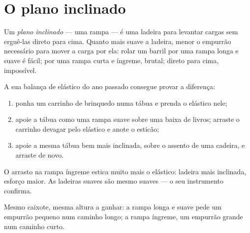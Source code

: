 \section{O plano inclinado}

\begin{definition}\label{def:g5:simple-machines:ramp}
Um \emph{plano inclinado} --- uma rampa --- é
uma ladeira para levantar cargas sem erguê-las direto para cima.
Quanto mais suave a ladeira, menor o empurrão necessário para mover a
carga por ela: rolar um barril por uma rampa longa e suave é fácil;
por uma rampa curta e íngreme, brutal; direto para cima, impossível.
\end{definition}

\begin{method}\label{met:g5:simple-machines:measure}
A sua balança de elástico do ano passado consegue provar a diferença:
\begin{enumerate}
  \item ponha um carrinho de brinquedo numa tábua e prenda o elástico
        nele;
  \item apoie a tábua como uma rampa suave sobre uma  baixa de
        livros; arraste o carrinho devagar pelo elástico e anote o
        esticão;
  \item apoie a mesma tábua bem mais inclinada, sobre o assento de
        uma cadeira, e arraste de novo.
\end{enumerate}
O arrasto na rampa íngreme estica muito mais o elástico: ladeira mais
inclinada, esforço maior. As ladeiras suaves são mesmo suaves --- o
seu instrumento confirma.
\end{method}

\begin{omfigure}

{\small Mesmo caixote, mesma altura a ganhar: a rampa longa e suave
pede um empurrão pequeno num caminho longo; a rampa íngreme, um
empurrão grande num caminho curto.}
\end{omfigure}


